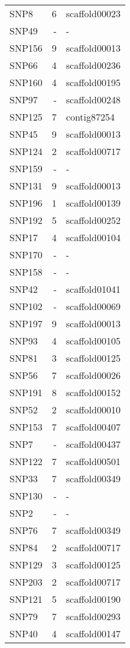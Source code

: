 \documentclass[smallextended]{svjour3}       %
\begin{document}
\begin{longtable}{lrl}
  SNP8 &   6 & scaffold00023 \\ 
  SNP49 & - & - \\ 
  SNP156 &   9 & scaffold00013 \\ 
  SNP66 &   4 & scaffold00236 \\ 
  SNP160 &   4 & scaffold00195 \\ 
  SNP97 & - & scaffold00248 \\ 
  SNP125 &   7 & contig87254 \\ 
  SNP45 &   9 & scaffold00013 \\ 
  SNP124 &   2 & scaffold00717 \\ 
  SNP159 & - & - \\ 
  SNP131 &   9 & scaffold00013 \\ 
  SNP196 &   1 & scaffold00139 \\ 
  SNP192 &   5 & scaffold00252 \\ 
  SNP17 &   4 & scaffold00104 \\ 
  SNP170 & - & - \\ 
  SNP158 & - & - \\ 
  SNP42 & - & scaffold01041 \\ 
  SNP102 & - & scaffold00069 \\ 
  SNP197 &   9 & scaffold00013 \\ 
  SNP93 &   4 & scaffold00105 \\ 
  SNP81 &   3 & scaffold00125 \\ 
  SNP56 &   7 & scaffold00026 \\ 
  SNP191 &   8 & scaffold00152 \\ 
  SNP52 &   2 & scaffold00010 \\ 
  SNP153 &   7 & scaffold00407 \\ 
  SNP7 & - & scaffold00437 \\ 
  SNP122 &   7 & scaffold00501 \\ 
  SNP33 &   7 & scaffold00349 \\ 
  SNP130 & - & - \\ 
  SNP2 & - & - \\ 
  SNP76 &   7 & scaffold00349 \\ 
  SNP84 &   2 & scaffold00717 \\ 
  SNP129 &   3 & scaffold00125 \\ 
  SNP203 &   2 & scaffold00717 \\ 
  SNP121 &   5 & scaffold00190 \\ 
  SNP79 &   7 & scaffold00293 \\ 
  SNP40 &   4 & scaffold00147 \\ 

\end{longtable}
\end{document}
